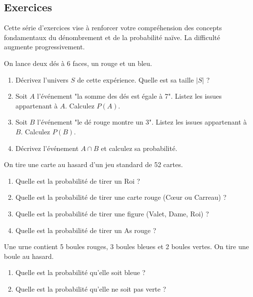 

\subsection{Exercices}

Cette série d'exercices vise à renforcer votre compréhension des concepts fondamentaux du dénombrement et de la probabilité naïve. La difficulté augmente progressivement.


\begin{exercicebox}
On lance deux dés à 6 faces, un rouge et un bleu.
\begin{enumerate}
    \item Décrivez l'univers $S$ de cette expérience. Quelle est sa taille $|S|$ ?
    \item Soit $A$ l'événement "la somme des dés est égale à 7". Listez les issues appartenant à $A$. Calculez $P(A)$.
    \item Soit $B$ l'événement "le dé rouge montre un 3". Listez les issues appartenant à $B$. Calculez $P(B)$.
    \item Décrivez l'événement $A \cap B$ et calculez sa probabilité.
\end{enumerate}
\end{exercicebox}

\begin{exercicebox}
On tire une carte au hasard d'un jeu standard de 52 cartes.
\begin{enumerate}
    \item Quelle est la probabilité de tirer un Roi ?
    \item Quelle est la probabilité de tirer une carte rouge (Cœur ou Carreau) ?
    \item Quelle est la probabilité de tirer une figure (Valet, Dame, Roi) ?
    \item Quelle est la probabilité de tirer un As rouge ?
\end{enumerate}
\end{exercicebox}

\begin{exercicebox}
Une urne contient 5 boules rouges, 3 boules bleues et 2 boules vertes. On tire une boule au hasard.
\begin{enumerate}
    \item Quelle est la probabilité qu'elle soit bleue ?
    \item Quelle est la probabilité qu'elle ne soit pas verte ?
\end{enumerate}
\end{exercicebox}

